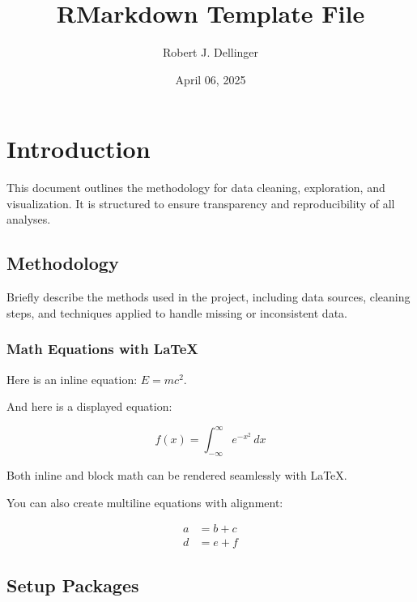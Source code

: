 \documentclass[
  12pt,
]{article}
\title{RMarkdown Template File}
\author{Robert J. Dellinger}
\date{April 06, 2025}
\begin{document}
\maketitle

{
\setcounter{tocdepth}{3}
\tableofcontents
}
\newpage
\tracingall

\section{Introduction}\label{introduction}

This document outlines the methodology for data cleaning, exploration,
and visualization. It is structured to ensure transparency and
reproducibility of all analyses.

\subsection{Methodology}\label{methodology}

Briefly describe the methods used in the project, including data
sources, cleaning steps, and techniques applied to handle missing or
inconsistent data.

\subsubsection{Math Equations with
LaTeX}\label{math-equations-with-latex}

Here is an inline equation: \(E = mc^2\).

And here is a displayed equation:

\begin{equation}
f(x) = \int_{-\infty}^{\infty} e^{-x^2} \, dx
\end{equation}

Both inline and block math can be rendered seamlessly with LaTeX.

You can also create multiline equations with alignment:

\begin{equation}
\begin{aligned}
a &= b + c \\
d &= e + f
\end{aligned}
\end{equation}

\subsection{Setup Packages}\label{setup-packages}
\end{document}
